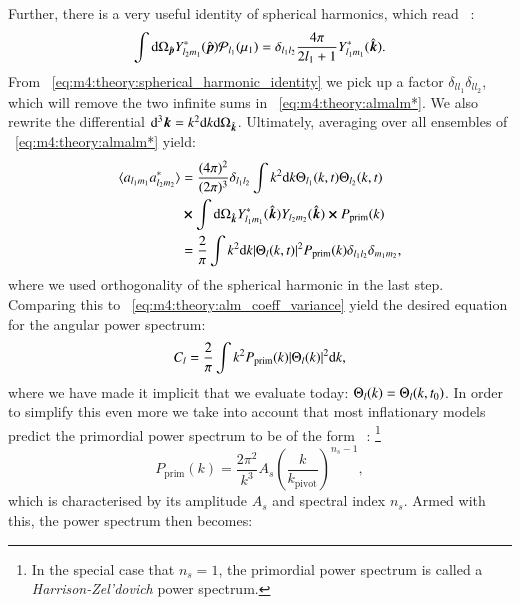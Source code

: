         Further, there is a very useful identity of spherical harmonics, which read ~\cite{dodelson2020modern}:
        \begin{equation}\label{eq:m4:theory:spherical_harmonic_identity}
            \int\mathrm{d}\Omega_{\hat{\boldsymbol{p}}}Y^*_{l_2m_1}({\hat{\boldsymbol{p}}})\mathcal{P}_{l_1}(\mu_1) = \delta_{l_1l_2}\frac{4\pi}{2l_1+1}Y_{l_1m_1}^*({\hat{\boldsymbol{k}}}).
        \end{equation}
        From ~\cref{eq:m4:theory:spherical_harmonic_identity} we pick up a factor $\delta_{ll_1}\delta_{ll_2}$, which will remove the two infinite sums in ~\cref{eq:m4:theory:almalm*}. We also rewrite the differential $\mathrm{d}^3\boldsymbol{k} = k^2\mathrm{d} k\mathrm{d}\Omega_{\hat{\boldsymbol{k}}}$. Ultimately, averaging over all ensembles of ~\cref{eq:m4:theory:almalm*} yield:
        \begin{equation}\label{eq:m4:theory:getting_to_the C_l}
            \begin{split}
                \langle a_{l_1m_1}a_{l_2m_2}^*\rangle &= \frac{(4\pi)^2}{(2\pi)^3}\delta_{l_1l_2}\int k^2\mathrm{d} k\Theta_{l_1}(k,t)\Theta_{l_2}(k,t) \\
                &\cross \int\mathrm{d}\Omega_{\hat{\boldsymbol{k}}}Y_{l_1m_1}^*({\hat{\boldsymbol{k}}})Y_{l_2m_2}({\hat{\boldsymbol{k}}})\cross P_\mathrm{prim}(k)\\
                &= \frac{2}{\pi}\int k^2\mathrm{d} k\abs{\Theta_l(k,t)}^2P_\mathrm{prim}(k)\delta_{l_1l_2}\delta_{m_1m_2},
            \end{split}
        \end{equation}
        where we used orthogonality of the spherical harmonic in the last step. Comparing this to ~\cref{eq:m4:theory:alm_coeff_variance} yield the desired equation for the angular power spectrum:
        \begin{equation}\label{eq:m4:theory:Cl_integral_intermediate}
            C_l = \frac{2}{\pi}\int k^2 P_\mathrm{prim}(k)\abs{\Theta_l(k)}^2\mathrm{d} k,
        \end{equation}
        where we have made it implicit that we evaluate today: $\Theta_l(k) = \Theta_l(k,t_0)$. In order to simplify this even more we take into account that most inflationary models predict the primordial power spectrum to be of the form ~\cite{dodelson2020modern}: \footnote{In the special case that $n_s=1$, the primordial power spectrum is called a \textit{Harrison-Zel'dovich} power spectrum.}
        \begin{equation}\label{eq:m4:theory:primordial_power_spectrum}
            P_\mathrm{prim}(k) = \frac{2\pi^2}{k^3}A_s\left(\frac{k}{k_\mathrm{pivot}}\right)^{n_s-1},
        \end{equation}
        which is characterised by its amplitude $A_s$ and spectral index $n_s$. Armed with this, the power spectrum then becomes:
